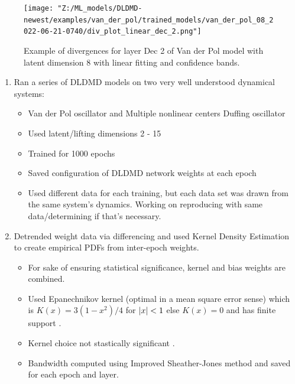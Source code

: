 \begin{figure}[ht]
    \centering
    \begin{minipage}{\textwidth}
        \texttt{[image: "Z:/ML\_models/DLDMD-newest/examples/van\_der\_pol/trained\_models/van\_der\_pol\_08\_2022-06-21-0740/div\_plot\_linear\_dec\_2.png"]}
    \end{minipage}
    \caption{Example of divergences for layer Dec 2 of Van der Pol model with latent dimension 8 
    with linear fitting and confidence bands.}
    \label{fig:divergence of model example}
\end{figure}



\begin{enumerate}
  \item Ran a series of DLDMD models on two very well understood dynamical systems:
  \begin{itemize}
    \item Van der Pol oscillator and Multiple nonlinear centers Duffing oscillator
    \item Used latent/lifting dimensions 2 - 15
    \item Trained for 1000 epochs
    \item Saved configuration of DLDMD network weights at each epoch
    \item Used different data for each training, but each data set was drawn from 
    the same system's dynamics. Working on reproducing with same data/determining
    if that's necessary.
  \end{itemize}
  
  \item Detrended weight data via differencing and used Kernel Density Estimation to create
  empirical PDFs from inter-epoch weights.
  \begin{itemize}
    \item For sake of ensuring statistical significance, kernel and bias weights are combined.
    \item Used Epanechnikov kernel (optimal in a mean square error sense) which is $K(x) = 
    3(1-x^2)/4$ for $\left|x\right| < 1$ else $K(x) = 0$ and has finite support \cite{epanechnikov}.
    \item Kernel choice not stastically significant \cite{epanechnikov}.
    \item Bandwidth computed using Improved Sheather-Jones method \cite{botev} and saved for 
    each epoch and layer.
  \end{itemize}


\end{enumerate}

